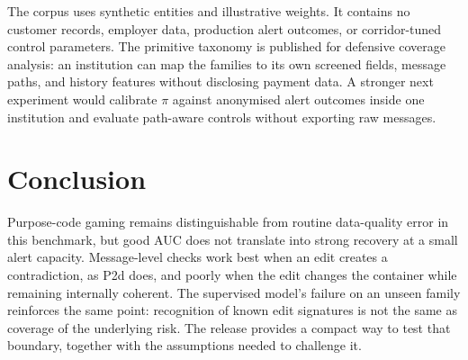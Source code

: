 \documentclass[conference]{IEEEtran}
\begin{document}
The corpus uses synthetic entities and illustrative weights. It contains no
customer records, employer data, production alert outcomes, or corridor-tuned
control parameters. The primitive taxonomy is published for defensive coverage
analysis: an institution can map the families to its own screened fields,
message paths, and history features without disclosing payment data. A stronger
next experiment would calibrate $\pi$ against anonymised alert outcomes inside
one institution and evaluate path-aware controls without exporting raw
messages.

\section{Conclusion}
Purpose-code gaming remains distinguishable from routine data-quality error in
this benchmark, but good AUC does not translate into strong recovery at a small
alert capacity. Message-level checks work best when an edit creates a
contradiction, as P2d does, and poorly when the edit changes the container while
remaining internally coherent. The supervised model's failure on an unseen
family reinforces the same point: recognition of known edit signatures is not
the same as coverage of the underlying risk. The release provides a compact
way to test that boundary, together with the assumptions needed to challenge
it.
\end{document}
